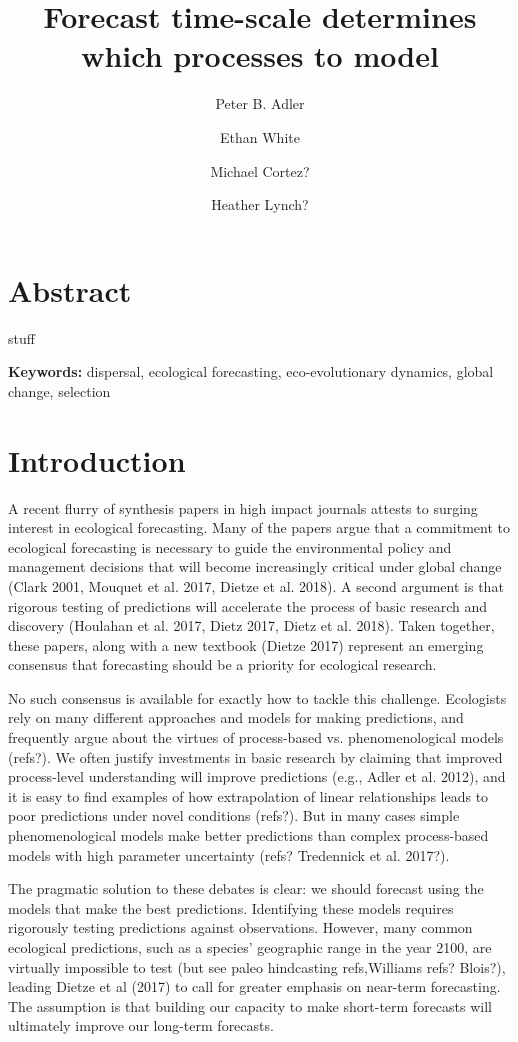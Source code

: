 \documentclass[11pt]{article}
\title{\textbf{ Forecast time-scale determines which processes to model }}
\author[1]{Peter B. Adler}  %
\author[2]{Ethan White}
\author[1]{Michael Cortez?}
\author[3]{Heather Lynch?}
\affil[1]{Department of Wildland Resources and the Ecology Center, Utah State University, Logan, Utah}
\affil[2]{some shitty Florida joint}
\begin{document}
\maketitle

\linenumbers

\section*{Abstract}

stuff

\textbf{\large{Keywords:}} dispersal, ecological forecasting, eco-evolutionary dynamics, global change, selection

\section*{Introduction}

A recent flurry of synthesis papers in high impact journals attests to surging interest in ecological forecasting. Many of the papers 
argue that a commitment to ecological forecasting is necessary to guide the environmental policy and management
decisions that will become increasingly critical under global change (Clark 2001, Mouquet et al. 2017, Dietze et al. 2018).
A second argument is that rigorous testing of predictions will accelerate the process of basic research and discovery (Houlahan et al. 2017, Dietz 2017, Dietz et al. 2018).
Taken together, these papers, along with a new textbook (Dietze 2017) represent an emerging consensus that forecasting should be a priority for ecological research.

No such consensus is available for exactly how to tackle this challenge.
Ecologists rely on many different approaches and models for making predictions, and 
frequently argue about the virtues of process-based vs. phenomenological models (refs?).
We often justify investments in basic research by claiming that improved process-level understanding will improve predictions (e.g., Adler et al. 2012),
and it is easy to find examples of how extrapolation of linear relationships leads to poor predictions under novel conditions (refs?).
But in many cases simple phenomenological models make better predictions than complex process-based models with high parameter
uncertainty (refs? Tredennick et al. 2017?).

The pragmatic solution to these debates is clear: we should forecast using the models that make the best predictions.
Identifying these models requires rigorously testing predictions against observations. However, many common ecological predictions,
such as a species' geographic range in the year 2100, are virtually impossible to test (but see paleo hindcasting refs,Williams refs? Blois?), 
leading Dietze et al (2017) to call for greater emphasis on near-term forecasting. The assumption is that building 
our capacity to make short-term forecasts will ultimately improve our long-term forecasts.
\end{document}
